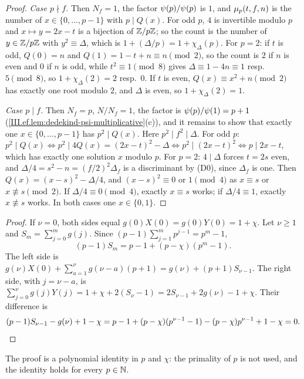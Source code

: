 \begin{proposition}
\end{proposition}
\begin{proof}
\emph{Case $p\nmid f$.} Then $N_f=1$, the factor $\psi(p)/\psi(p)$ is $1$, and $\mu_p(t,f,n)$ is the number of $x\in\{0,\dots,p-1\}$ with
$p\mid Q(x)$. For odd $p$, $4$ is invertible modulo $p$ and $x\mapsto y=2x-t$ is a bijection of $\mathbb{Z}/p\mathbb{Z}$; so the count is the number of $y\in\mathbb{Z}/p\mathbb{Z}$ with
$y^2\equiv\Delta$, which is $1+(\Delta/p)=1+\chi_\Delta(p)$. For $p=2$: if $t$ is odd, $Q(0)=n$ and $Q(1)=1-t+n\equiv n\pmod2$, so the count is $2$ if
$n$ is even and $0$ if $n$ is odd, while $t^2\equiv1\pmod8$ gives $\Delta\equiv1-4n\equiv1$ resp.\ $5\pmod8$, so $1+\chi_\Delta(2)=2$ resp.\ $0$. If
$t$ is even, $Q(x)\equiv x^2+n\pmod2$ has exactly one root modulo $2$, and $\Delta$ is even, so $1+\chi_\Delta(2)=1$.

\emph{Case $p\mid f$.} Then $N_f=p$, $N/N_f=1$, the factor is $\psi(p)/\psi(1)=p+1$ (\cref{III.ef.lem:dedekind-psi-multiplicative}(c)), and
it remains to show that exactly one $x\in\{0,\dots,p-1\}$ has $p^2\mid Q(x)$. Here $p^2\mid f^2\mid\Delta$. For odd $p$:
$p^2\mid Q(x)\iff p^2\mid4Q(x)=(2x-t)^2-\Delta\iff p^2\mid(2x-t)^2\iff p\mid2x-t$, which has exactly one solution $x$ modulo $p$. For $p=2$: $4\mid\Delta$
forces $t=2s$ even, and $\Delta/4=s^2-n=(f/2)^2\Delta_f$ is a discriminant by (D0), since $\Delta_f$ is one. Then $Q(x)=(x-s)^2-\Delta/4$, and
$(x-s)^2\equiv0$ or $1\pmod4$ as $x\equiv s$ or $x\not\equiv s\pmod2$. If $\Delta/4\equiv0\pmod4$, exactly $x\equiv s$ works; if $\Delta/4\equiv1$, exactly
$x\not\equiv s$ works. In both cases one $x\in\{0,1\}$.
\end{proof}

\begin{lemma}
\end{lemma}
\begin{proof}
If $\nu=0$, both sides equal $g(0)X(0)=g(0)Y(0)=1+\chi$. Let $\nu\ge1$ and $S_m=\sum_{j=0}^mg(j)$. Since $(p-1)\sum_{j=1}^mp^{j-1}=p^m-1$,
\[
  (p-1)S_m=p-1+(p-\chi)(p^m-1).
\]
The left side is $g(\nu)X(0)+\sum_{a=1}^{\nu}g(\nu-a)(p+1)=g(\nu)+(p+1)S_{\nu-1}$. The right side, with $j=\nu-a$, is
$\sum_{j=0}^{\nu}g(j)Y(j)=1+\chi+2(S_\nu-1)=2S_{\nu-1}+2g(\nu)-1+\chi$. Their difference is
\[
  (p-1)S_{\nu-1}-g(\nu)+1-\chi=p-1+(p-\chi)(p^{\nu-1}-1)-(p-\chi)p^{\nu-1}+1-\chi=0. \qedhere
\]
\end{proof}
\noindent The proof is a polynomial identity in $p$ and $\chi$: the primality of $p$ is not used, and the identity holds for every $p\in\mathbb{N}$.

